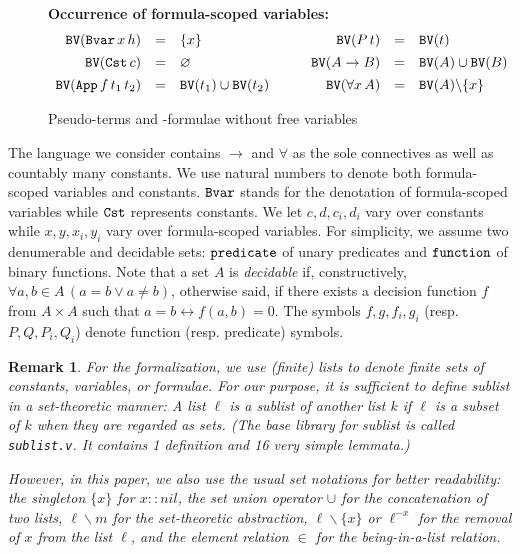 \documentclass{svjour3}                     %
\newtheorem{rem}[thm]{Remark}
\newcommand{\bs}{\backslash}
\newcommand{\sing}[1]{\{ #1 \}}
\newcommand{\tApp}{\textup{\tt App}}
\newcommand{\tBvar}{\textup{\tt Bvar}}
\newcommand{\tCst}{\textup{\tt Cst}}
\newcommand{\tFvar}{\textup{\tt Fvar}}
\newcommand{\tfunction}{\textup{\tt function}}
\newcommand{\tpredicate}{\textup{\tt predicate}}
\newcommand{\tPH}{\textup{\tt BV}}
\begin{document}
\begin{figure}[t]
\textbf{Occurrence of formula-scoped variables:}
\[
\begin{array}{rcl}
  \tPH(\tBvar\, x\, h) & = & \sing{x}\\[1ex]
  \tPH(\tCst\, c) & = & \varnothing\\[1ex]
  \tPH(\tApp\, f\, t_1\, t_2) & = & \tPH(t_1) \cup \tPH(t_2)
\end{array} \qquad
\begin{array}{rcl}
  \tPH(P\, t) & = & \tPH(t)\\[1ex]
  \tPH(A \to B) & = & \tPH(A) \cup \tPH(B)\\[1ex]
  \tPH(\forall x\, A) & = & \tPH(A) \bs \sing{x}
\end{array}
\] 
\hrulefill
\caption{Pseudo-terms and -formulae without free variables}
  \label{fig:pseudo}
\end{figure}

The language we consider contains $\to$ and $\forall$ as the sole connectives as well as countably many constants. We use natural numbers to denote both formula-scoped variables and constants. $\tBvar$ stands for the denotation of formula-scoped variables while $\tCst$ represents constants. We let $c, d, c_i, d_i$ vary over constants while $x, y, x_i, y_i$ vary over formula-scoped variables. For simplicity, we assume two denumerable and decidable sets: $\tpredicate$ of unary predicates and $\tfunction$ of binary functions. Note that a set $A$ is {\em decidable} if, constructively, $\forall a, b \in A \, (a=b \lor a\neq b)$, otherwise said, if there exists a decision function $f$ from $A \times A$ such that $a=b \leftrightarrow f(a,b)=0$. The symbols $f,g, f_i, g_i$ (resp. $P, Q, P_i, Q_i$) denote function (resp. predicate) symbols.

\begin{rem}
For the formalization, we use (finite) lists to denote finite sets of constants, variables, or formulae. For our purpose, it is sufficient to define \textit{sublist} in a set-theoretic manner: A list $\ell$ is a sublist of another list $k$ if $\ell$ is a subset of $k$ when they are regarded as sets. (The base library for sublist is called \verb|sublist.v|. It contains 1 definition and 16 very simple lemmata.)

However, in this paper, we also use the usual set notations for better readability: the singleton $\sing{x}$ for $x :: nil$, the set union operator $\cup$ for the concatenation of two lists, $\ell\bs m$ for the set-theoretic abstraction, $\ell\bs\sing{x}$ or $\ell^{-x}$ for the removal of $x$ from the list $\ell$, and the element relation $\in$ for the {\em being-in-a-list} relation.\medskip
\end{rem}
\end{document}
